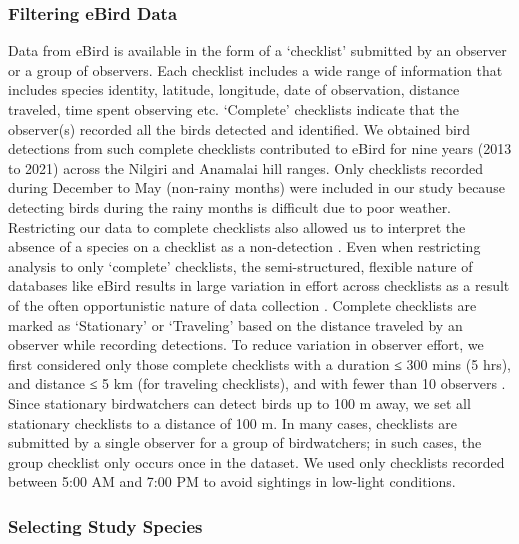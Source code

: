 \subsubsection*{Filtering eBird Data}

Data from eBird is available in the form of a `checklist' submitted by an observer or a group of observers.
Each checklist includes a wide range of information that includes species identity, latitude, longitude, date of observation, distance traveled, time spent observing etc.
`Complete' checklists indicate that the observer(s) recorded all the birds detected and identified.
We obtained bird detections from such complete checklists contributed to eBird for nine years (2013 to 2021) across the Nilgiri and Anamalai hill ranges.
Only checklists recorded during December to May (non-rainy months) were included in our study because detecting birds during the rainy months is difficult due to poor weather.
Restricting our data to complete checklists also allowed us to interpret the absence of a species on a checklist as a non-detection \citep[called zero-filling][]{johnston2021a}.
Even when restricting analysis to only `complete' checklists, the semi-structured, flexible nature of databases like eBird results in large variation in effort across checklists as a result of the often opportunistic nature of data collection \citep{kelling2019a}.
Complete checklists are marked as `Stationary' or `Traveling' based on the distance traveled by an observer while recording detections.
To reduce variation in observer effort, we first considered only those complete checklists with a duration ≤ 300 mins (5 hrs), and distance ≤ 5 km (for traveling checklists), and with fewer than 10 observers \citep[following][]{johnston2019d}.
Since stationary birdwatchers can detect birds up to 100 m away, we set all stationary checklists to a distance of 100 m.
In many cases, checklists are submitted by a single observer for a group of birdwatchers; in such cases, the group checklist only occurs once in the dataset.
We used only checklists recorded between 5:00 AM and 7:00 PM to avoid sightings in low-light conditions.

\subsubsection*{Selecting Study Species}

